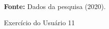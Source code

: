 \begin{figure}[ht!]
\centering

\caption{\textmd{Exercício do Usuário 11}}
\label{fig:errodevnesp}

\par\medskip\textbf{Fonte:} Dados da pesquisa (2020). \par\medskip

\end{figure}

